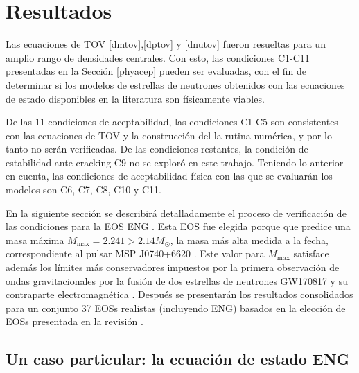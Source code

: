 \chapter{Resultados}

\noindent Las ecuaciones de TOV \eqref{dmtov},\eqref{dptov} y \eqref{dnutov} fueron resueltas para un amplio rango de densidades centrales. Con esto, las condiciones C1-C11 presentadas en la Sección \ref{phyacep} pueden ser evaluadas, con el fin de determinar si los modelos de estrellas de neutrones obtenidos con las ecuaciones de estado disponibles en la literatura son físicamente viables.

De las 11 condiciones de aceptabilidad, las condiciones C1-C5 son consistentes con las ecuaciones de TOV y la construcción del la rutina numérica, y por lo tanto no serán verificadas. De las condiciones restantes, la condición de estabilidad ante cracking C9 no se exploró en este trabajo. Teniendo lo anterior en cuenta, las condiciones de aceptabilidad física con las que se evaluarán los modelos son C6, C7, C8, C10 y C11.


En la siguiente sección se describirá detalladamente el proceso de verificación de las condiciones para la EOS ENG \cite{Engvik1994}. Esta EOS fue elegida porque que predice una masa máxima $M_{\text{max}}= 2.241 > 2.14M_{\odot}$, la masa más alta medida a la fecha, correspondiente al pulsar MSP J0740+6620 \cite{Cromartie2019}. Este valor para $M_{\text{max}}$ satisface además los límites más conservadores impuestos por la primera observación de ondas gravitacionales por la fusión de dos estrellas de neutrones GW170817 y su contraparte electromagnética \cite{Rezzolla2017,Radice2018,Ruiz2018,Shibata2019}. Después se presentarán los resultados consolidados para un conjunto 37 EOSs realistas (incluyendo ENG) basados en la elección de EOSs presentada en la revisión \cite{Ozel2016}.

\section{Un caso particular: la ecuación de estado ENG}

